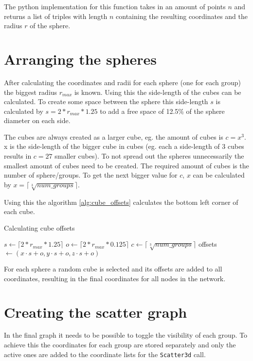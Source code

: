 The python implementation for this function takes in an amount of points $n$ and returns a list of triples with length $n$ containing the resulting coordinates and the radius $r$ of the sphere.

\section{Arranging the spheres}
After calculating the coordinates and radii for each sphere (one for each group) the biggest radius $r_{max}$ is known. Using this the side-length of the cubes can be calculated. To create some space between the sphere this side-length $s$ is calculated by $s = 2 * r_{max} * 1.25$ to add a free space of 12.5\% of the sphere diameter on each side.

The cubes are always created as a larger cube, eg. the amount of cubes is $c = x^3$. x is the side-length of the bigger cube in cubes (eg. each a side-length of 3 cubes results in $c=27$ smaller cubes). To not spread out the spheres unnecessarily the smallest amount of cubes need to be created. The required amount of cubes is the number of sphere/groups. To get the next bigger value for $c$, $x$ can be calculated by $x =\lceil\sqrt[3]{num\_groups}\rceil$.

Using this the algorithm \ref{alg:cube_offsets} calculates the bottom left corner of each cube.

\begin{algorithm}
\caption{Calculating cube offsets}
\label{alg:cube_offsets}
\begin{algorithmic}
\State $s \gets \lceil 2 * r_{max} * 1.25\rceil$
\State $o \gets \lceil 2 * r_{max} * 0.125\rceil$
\State $c \gets \lceil\sqrt[3]{num\_groups}\rceil$
    \State offsets $\gets (x \cdot s + o, y \cdot s + o, z \cdot s + o)$
\EndFor
\end{algorithmic}
\end{algorithm}

For each sphere a random cube is selected and its offsets are added to all coordinates, resulting in the final coordinates for all nodes in the network.

\section{Creating the scatter graph}
\label{sub:scatter_graph}
In the final graph it needs to be possible to toggle the visibility of each group. To achieve this the coordinates for each group are stored separately and only the active ones are added to the coordinate lists for the \texttt{Scatter3d} call.

